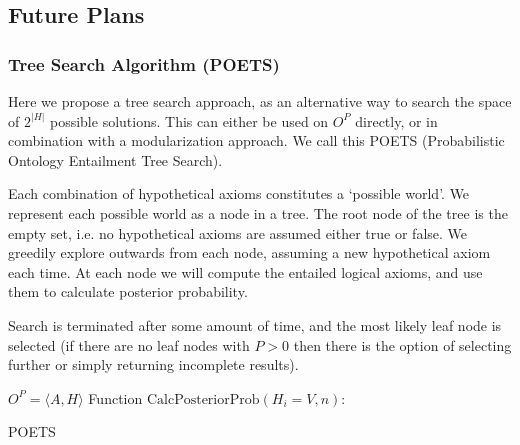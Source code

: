 \documentclass{my}
\begin{document}
\subsection{Future Plans}
\subsubsection{Tree Search Algorithm (POETS)}

Here we propose a tree search approach, as an alternative way to
search the space of $2^|H|$ possible solutions. This can either be
used on $O^P$ directly, or in combination with a modularization
approach. We call this POETS (Probabilistic Ontology Entailment Tree
Search).

Each combination of hypothetical axioms constitutes a ‘possible
world’. We represent each possible world as a node in a tree. The root
node of the tree is the empty set, i.e. no hypothetical axioms are
assumed either true or false. We greedily explore outwards from each
node, assuming a new hypothetical axiom each time. At each node we
will compute the entailed logical axioms, and use them to calculate
posterior probability.

Search is terminated after some amount of time, and the most likely
leaf node is selected (if there are no leaf nodes with $P>0$ then
there is the option of selecting further or simply returning
incomplete results).

\begin{algorithm}
 $O^P = \langle A,H \rangle$\;
  Function $\text{CalcPosteriorProb}(H_i=V, n):$ \;
  \caption{POETS}
\end{algorithm}
\end{document}
